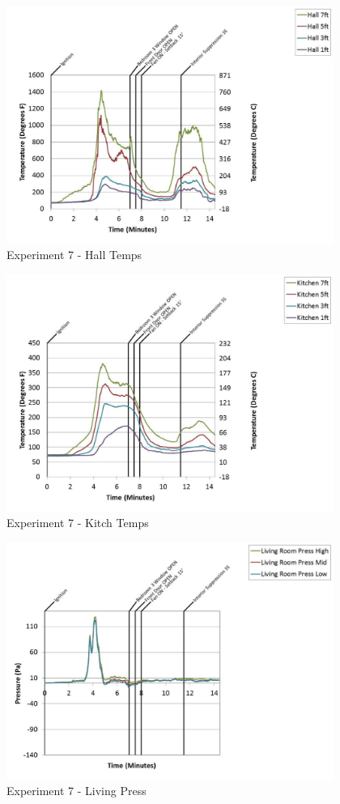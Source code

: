 \documentclass{article}
\begin{document}
\begin{appendices}
	\begin{figure}[h!]
		\centering
		\includegraphics[height=3.05in]{0_Images/Results_Charts/Exp_7_Charts/HallTemps.pdf}
		\caption{Experiment 7 - Hall Temps}
	\end{figure}
 
	\clearpage

	\begin{figure}[h!]
		\centering
		\includegraphics[height=3.05in]{0_Images/Results_Charts/Exp_7_Charts/KitchTemps.pdf}
		\caption{Experiment 7 - Kitch Temps}
	\end{figure}
 

	\begin{figure}[h!]
		\centering
		\includegraphics[height=3.05in]{0_Images/Results_Charts/Exp_7_Charts/LivingPress.pdf}
		\caption{Experiment 7 - Living Press}
	\end{figure}
 

\end{appendices}
\end{document}
